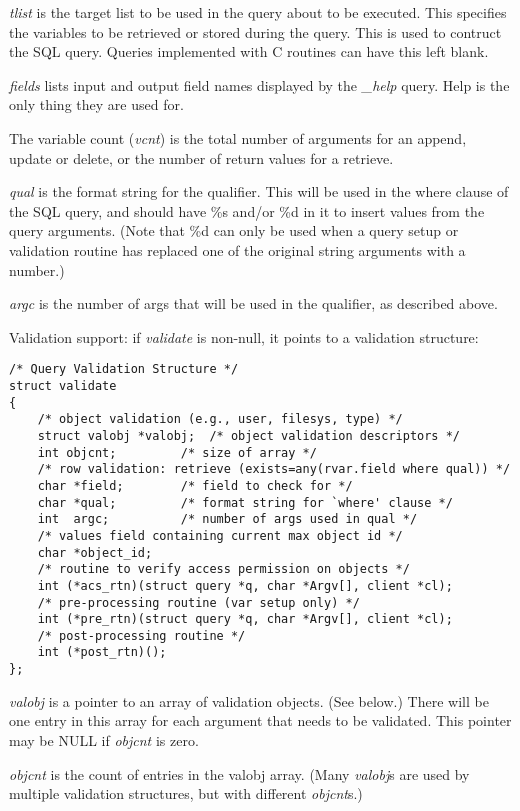 {\it tlist\/} is the target list to be used in the query about to be
executed. This specifies the variables to be retrieved or stored
during the query. This is used to contruct the SQL query. Queries
implemented with C routines can have this left blank.

{\it fields\/} lists input and output field names displayed by the
{\it \_help\/} query. Help is the only thing they are used for.

The variable count ({\it vcnt\/}) is the total number of arguments for an
append, update or delete, or the number of return values for a
retrieve.

{\it qual\/} is the format string for the qualifier. This will be used
in the where clause of the SQL query, and should have \%s and/or \%d
in it to insert values from the query arguments. (Note that \%d can
only be used when a query setup or validation routine has replaced one
of the original string arguments with a number.)

{\it argc\/} is the number of args that will be used in the qualifier, as
described above.

Validation support: if {\it validate\/} is non-null, it points to a
validation structure:

\begin{verbatim}
/* Query Validation Structure */
struct validate
{
    /* object validation (e.g., user, filesys, type) */
    struct valobj *valobj;	/* object validation descriptors */
    int objcnt;			/* size of array */
    /* row validation: retrieve (exists=any(rvar.field where qual)) */
    char *field;		/* field to check for */
    char *qual;			/* format string for `where' clause */
    int  argc;			/* number of args used in qual */
    /* values field containing current max object id */
    char *object_id;
    /* routine to verify access permission on objects */
    int (*acs_rtn)(struct query *q, char *Argv[], client *cl);
    /* pre-processing routine (var setup only) */
    int (*pre_rtn)(struct query *q, char *Argv[], client *cl);
    /* post-processing routine */
    int (*post_rtn)();
};
\end{verbatim}

{\it valobj\/} is a pointer to an array of validation objects. (See
below.) There will be one entry in this array for each argument that
needs to be validated. This pointer may be NULL if {\it objcnt\/} is
zero.

{\it objcnt\/} is the count of entries in the valobj array. (Many {\it
valobj\/}s are used by multiple validation structures, but with
different {\it objcnt\/}s.)

